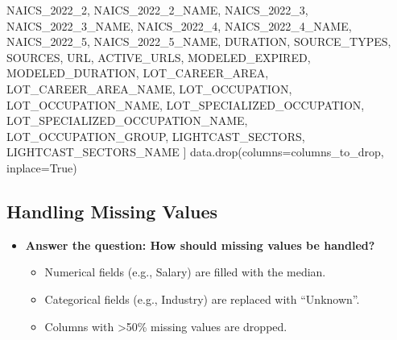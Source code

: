 \documentclass[
  letterpaper,
  DIV=11,
  numbers=noendperiod]{scrartcl}
\newenvironment{Shaded}{\begin{snugshade}}{\end{snugshade}}
\newcommand{\NormalTok}[1]{\textcolor[rgb]{0.00,0.23,0.31}{#1}}
\newcommand{\OperatorTok}[1]{\textcolor[rgb]{0.37,0.37,0.37}{#1}}
\newcommand{\StringTok}[1]{\textcolor[rgb]{0.13,0.47,0.30}{#1}}
\newcommand{\VariableTok}[1]{\textcolor[rgb]{0.07,0.07,0.07}{#1}}
\providecommand{\tightlist}{%
  \setlength{\itemsep}{0pt}\setlength{\parskip}{0pt}}
\begin{document}
\begin{Shaded}
\begin{Highlighting}[]
\StringTok{\textquotesingle{}NAICS\_2022\_2\textquotesingle{}}\NormalTok{, }\StringTok{\textquotesingle{}NAICS\_2022\_2\_NAME\textquotesingle{}}\NormalTok{, }\StringTok{\textquotesingle{}NAICS\_2022\_3\textquotesingle{}}\NormalTok{, }\StringTok{\textquotesingle{}NAICS\_2022\_3\_NAME\textquotesingle{}}\NormalTok{, }\StringTok{\textquotesingle{}NAICS\_2022\_4\textquotesingle{}}\NormalTok{, }\StringTok{\textquotesingle{}NAICS\_2022\_4\_NAME\textquotesingle{}}\NormalTok{, }\StringTok{\textquotesingle{}NAICS\_2022\_5\textquotesingle{}}\NormalTok{, }\StringTok{\textquotesingle{}NAICS\_2022\_5\_NAME\textquotesingle{}}\NormalTok{,}
\StringTok{\textquotesingle{}DURATION\textquotesingle{}}\NormalTok{, }\StringTok{\textquotesingle{}SOURCE\_TYPES\textquotesingle{}}\NormalTok{, }\StringTok{\textquotesingle{}SOURCES\textquotesingle{}}\NormalTok{, }\StringTok{\textquotesingle{}URL\textquotesingle{}}\NormalTok{, }\StringTok{\textquotesingle{}ACTIVE\_URLS\textquotesingle{}}\NormalTok{, }\StringTok{\textquotesingle{}MODELED\_EXPIRED\textquotesingle{}}\NormalTok{, }\StringTok{\textquotesingle{}MODELED\_DURATION\textquotesingle{}}\NormalTok{, }\StringTok{\textquotesingle{}LOT\_CAREER\_AREA\textquotesingle{}}\NormalTok{, }\StringTok{\textquotesingle{}LOT\_CAREER\_AREA\_NAME\textquotesingle{}}\NormalTok{,}
\StringTok{\textquotesingle{}LOT\_OCCUPATION\textquotesingle{}}\NormalTok{, }\StringTok{\textquotesingle{}LOT\_OCCUPATION\_NAME\textquotesingle{}}\NormalTok{, }\StringTok{\textquotesingle{}LOT\_SPECIALIZED\_OCCUPATION\textquotesingle{}}\NormalTok{, }\StringTok{\textquotesingle{}LOT\_SPECIALIZED\_OCCUPATION\_NAME\textquotesingle{}}\NormalTok{, }\StringTok{\textquotesingle{}LOT\_OCCUPATION\_GROUP\textquotesingle{}}\NormalTok{, }\StringTok{\textquotesingle{}LIGHTCAST\_SECTORS\textquotesingle{}}\NormalTok{,}
\StringTok{\textquotesingle{}LIGHTCAST\_SECTORS\_NAME\textquotesingle{}}
\NormalTok{]}
\NormalTok{data.drop(columns}\OperatorTok{=}\NormalTok{columns\_to\_drop, inplace}\OperatorTok{=}\VariableTok{True}\NormalTok{)}
\end{Highlighting}
\end{Shaded}

\subsection{Handling Missing Values}\label{handling-missing-values}

\begin{itemize}
\item
  \textbf{Answer the question: How should missing values be handled?}

  \begin{itemize}
  \tightlist
  \item
    Numerical fields (e.g., Salary) are filled with the median.
  \item
    Categorical fields (e.g., Industry) are replaced with ``Unknown''.
  \item
    Columns with \textgreater50\% missing values are dropped.
  \end{itemize}
\end{itemize}
\end{document}
